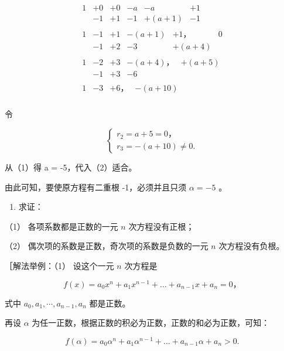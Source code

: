 \[
\begin{array}{l} \begin{array}{cccccc} 1 & + 0 & + 0 & - a & - a & + 1 \\ & - 1 & + 1 & - 1 & + (a + 1) & - 1 \end{array} \\ \begin{array}{cccccc} 1 & - 1 & + 1 & - (a + 1) & + 1\text{，} & 0 \\ & - 1 & + 2 & - 3 & + (a + 4) \end{array} \\ \begin{array}{ccccc} 1 & - 2 & + 3 & - (a + 4)\text{，} & + (a + 5) \\ & - 1 & + 3 & - 6 \end{array} \\ \begin{array}{ccccc} 1 & - 3 & + 6\text{，} & - (a + 10) \end{array} \\ \end{array}
\]

令

\[
\left\{ \begin{array}{l} r _ {2} = a + 5 = 0\text{，} \\ r _ {3} = - (a + 10) \neq 0. \end{array} \right. \tag {1}
\]

从（1）得 a = -5，代入（2）适合。

由此可知，要使原方程有二重根 -1，必须并且只须 \(\alpha = -5\) 。

\begin{enumerate}
\item
  求证：
\end{enumerate}

（1） 各项系数都是正数的一元 \(n\) 次方程没有正根；

（2） 偶次项的系数是正数，奇次项的系数是负数的一元 \(n\)
次方程没有负根。

［解法举例：（1） 设这个一元 \(n\) 次方程是

\[
f (x) = a _ {0} x ^ {n} + a _ {1} x ^ {n - 1} + \dots + a _ {n - 1} x + a _ {n} = 0\text{，}
\]

式中 \(a_{0}, a_{1}, \cdots, a_{n-1}, a_{n}\) 都是正数。

再设 \(\alpha\)
为任一正数，根据正数的积必为正数，正数的和必为正数，可知：

\[
f (\alpha) = a _ {0} \alpha^ {n} + a _ {1} \alpha^ {n - 1} + \dots + a _ {n - 1} \alpha + a _ {n} > 0.
\]

